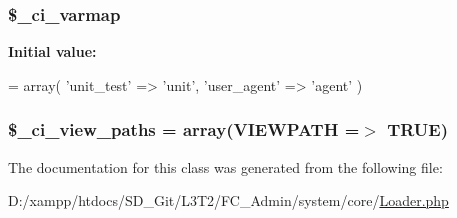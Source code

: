\subsubsection[{\$\+\_\+ci\+\_\+varmap}]{\setlength{\rightskip}{0pt plus 5cm}\$\+\_\+ci\+\_\+varmap\hspace{0.3cm}{\ttfamily [protected]}}\label{class_c_i___loader_a8dd33a8ab99688451b1f811f122d1114}
{\bfseries Initial value\+:}
\begin{DoxyCode}
=   array(
        \textcolor{stringliteral}{'unit\_test'} => \textcolor{stringliteral}{'unit'},
        \textcolor{stringliteral}{'user\_agent'} => \textcolor{stringliteral}{'agent'}
    )
\end{DoxyCode}
\hypertarget{class_c_i___loader_adc48c64c673b28c2447ea4214a27eeea}{}
\subsubsection[{\$\+\_\+ci\+\_\+view\+\_\+paths}]{\setlength{\rightskip}{0pt plus 5cm}\$\+\_\+ci\+\_\+view\+\_\+paths = array({\bf V\+I\+E\+W\+P\+A\+T\+H} =$>$ T\+R\+U\+E)\hspace{0.3cm}{\ttfamily [protected]}}\label{class_c_i___loader_adc48c64c673b28c2447ea4214a27eeea}


The documentation for this class was generated from the following file\+:\begin{DoxyCompactItemize}
\item 
D\+:/xampp/htdocs/\+S\+D\+\_\+\+Git/\+L3\+T2/\+F\+C\+\_\+\+Admin/system/core/\hyperlink{_loader_8php}{Loader.\+php}\end{DoxyCompactItemize}

